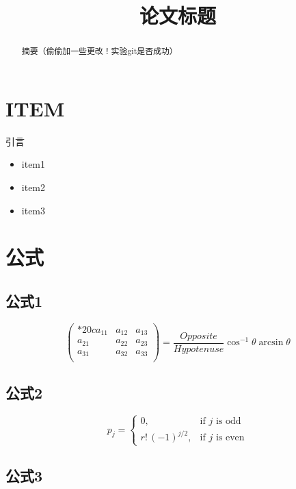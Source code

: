 \documentclass[bwprint]{cumcmthesis}
\title{论文标题}
\begin{document}
 \maketitle
 \begin{abstract}
 摘要（偷偷加一些更改！实验git是否成功）

\end{abstract}

\section{ITEM}

引言 \cite{huwei}

\begin{itemize}
	\item item1 \cite{deng:01a}
	\item item2
	\item item3
\end{itemize}

\section{公式}

\subsection{公式1}

\[
\begin{pmatrix}{*{20}c}
{a_{11} } & {a_{12} } & {a_{13} }  \\
{a_{21} } & {a_{22} } & {a_{23} }  \\
{a_{31} } & {a_{32} } & {a_{33} }  \\
\end{pmatrix}
= \frac{{Opposite}}{{Hypotenuse}}\cos ^{ - 1} \theta \arcsin \theta
\]

\subsection{公式2}

\[
p_{j}=\begin{cases} 0,&\text{if $j$ is odd}\\
r!\,(-1)^{j/2},&\text{if $j$ is even}
\end{cases}
\]

\subsection{公式3}
\end{document}
